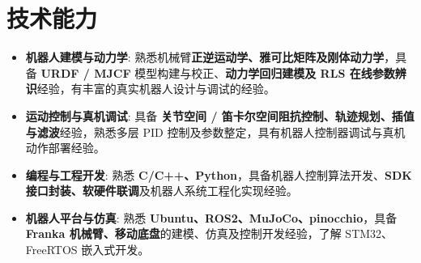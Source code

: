 \documentclass{resume}
\begin{document}
\section{\textcolor{myblue}{技术能力}}
\begin{itemize}
  \item \textbf{机器人建模与动力学}: 熟悉机械臂\textbf{正逆运动学、雅可比矩阵及刚体动力学}，具备 \textbf{URDF / MJCF} 模型构建与校正、\textbf{动力学回归建模及 RLS 在线参数辨识}经验，有丰富的真实机器人设计与调试的经验。
  \item \textbf{运动控制与真机调试}: 具备 \textbf{关节空间 / 笛卡尔空间阻抗控制、轨迹规划、插值与滤波}经验，熟悉多层 PID 控制及参数整定，具有机器人控制器调试与真机动作部署经验。
  \item \textbf{编程与工程开发}: 熟悉 \textbf{C/C++、Python}，具备机器人控制算法开发、\textbf{SDK 接口封装、软硬件联调}及机器人系统工程化实现经验。
  \item \textbf{机器人平台与仿真}: 熟悉 \textbf{Ubuntu、ROS2、MuJoCo、pinocchio}，具备 \textbf{Franka 机械臂、移动底盘}的建模、仿真及控制开发经验，了解 STM32、FreeRTOS 嵌入式开发。
\end{itemize}
\end{document}
